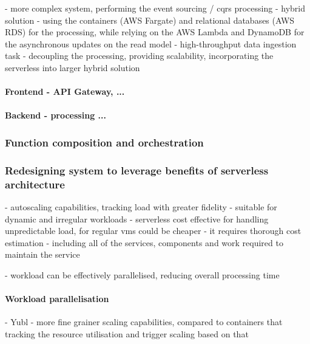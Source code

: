 \label{chapter:serverless-suitability-temenos}
- more complex system, performing the event sourcing / cqrs processing
- hybrid solution - using the containers (AWS Fargate) and relational databases (AWS RDS) for the processing, while relying on the AWS Lambda and DynamoDB for the asynchronous updates on the read model - high-throughput data ingestion task
- decoupling the processing, providing scalability, incorporating the serverless into larger hybrid solution

\paragraph{Frontend - API Gateway, ...}

\paragraph{Backend - processing ...}

\subsubsection{Function composition and orchestration}

\subsubsection{Redesigning system to leverage benefits of serverless architecture}

\label{chapter:serverless-suitability-utilisation-patterns}
- autoscaling capabilities, tracking load with greater fidelity - suitable for dynamic and irregular workloads
- serverless cost effective for handling unpredictable load, for regular vms could be cheaper - it requires thorough cost estimation - including all of the services, components and work required to maintain the service

\label{chapter:serverless-suitability-processing-time}
- workload can be effectively parallelised, reducing overall processing time

\paragraph{Workload parallelisation}

\label{chapter:serverless-suitability-for-web-based-workloads}
- Yubl - more fine grainer scaling capabilities, compared to containers that tracking the resource utilisation and trigger scaling based on that

